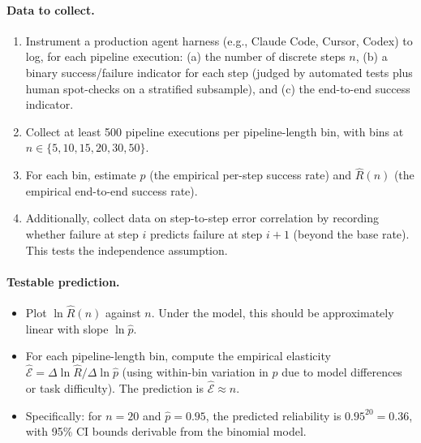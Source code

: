 \documentclass[11pt, a4paper, logo, copyright]{googledeepmind}
\begin{document}
\paragraph{Data to collect.}
\begin{enumerate}[nosep]
    \item Instrument a production agent harness (e.g., Claude Code, Cursor, Codex) to log, for each pipeline execution: (a) the number of discrete steps $n$, (b) a binary success/failure indicator for each step (judged by automated tests plus human spot-checks on a stratified subsample), and (c) the end-to-end success indicator.
    \item Collect at least 500 pipeline executions per pipeline-length bin, with bins at $n \in \{5, 10, 15, 20, 30, 50\}$.
    \item For each bin, estimate $\hat{p}$ (the empirical per-step success rate) and $\hat{R}(n)$ (the empirical end-to-end success rate).
    \item Additionally, collect data on step-to-step error correlation by recording whether failure at step $i$ predicts failure at step $i+1$ (beyond the base rate). This tests the independence assumption.
\end{enumerate}

\paragraph{Testable prediction.}
\begin{itemize}[nosep]
    \item Plot $\ln \hat{R}(n)$ against $n$. Under the model, this should be approximately linear with slope $\ln \hat{p}$.
    \item For each pipeline-length bin, compute the empirical elasticity $\hat{\mathcal{E}} = \Delta \ln \hat{R} / \Delta \ln \hat{p}$ (using within-bin variation in $p$ due to model differences or task difficulty). The prediction is $\hat{\mathcal{E}} \approx n$.
    \item Specifically: for $n = 20$ and $\hat{p} = 0.95$, the predicted reliability is $0.95^{20} = 0.36$, with 95\% CI bounds derivable from the binomial model.
\end{itemize}
\end{document}
